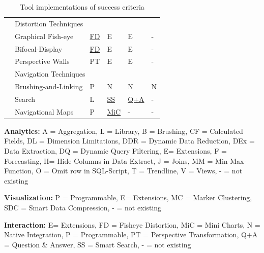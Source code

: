 \begin{table}[H]
\begin{tabular}{|l| l l l l l|}
        & \multicolumn{5}{l|}{\cellcolor{gray!30}Distortion Techniques}\\\cline{2-6}
        & Graphical Fish-eye    & \hyperlink{https://bost.ocks.org/mike/fisheye/}{ \gls{FD}  }      & \gls{E} & \gls{E} & - \\
        & Bifocal-Display       & \hyperlink{https://bost.ocks.org/mike/fisheye/}{ \gls{FD}  }      & \gls{E} & \gls{E} & - \\
        & Perspective Walls     &  \gls{PT} & \gls{E}& \gls{E}& - \\ \cline{2-6}
        
        & \multicolumn{5}{l|}{\cellcolor{gray!30}Navigation Techniques}\\\cline{2-6}
        & Brushing-and-Linking   & \gls{P} &  \gls{N} &  \gls{N} &  \gls{N} \\
        & Search                &  \gls{L} & \hyperlink{https://help.qlik.com/en-US/sense/2.2/Subsystems/Hub/Content/Search/search-tool.htm}{ \gls{SS}  }& \hyperlink{https://powerbi.microsoft.com/en-us/documentation/powerbi-service-q-and-a/}{ \gls{Q+A} }& - \\
        & Navigational Maps     & \gls{P} & \hyperlink{https://help.qlik.com/en-US/sense/1.1/Subsystems/Hub/Content/Visualizations/BarChart/BarChart.htm}{ \gls{MiC}  }  & -           & -\\
        \hline
    \end{tabular}
    \caption[Tool Implementations of Success Criteria]{Tool implementations of success criteria}
    \label{table:features}
    \end{table}
    
    \textbf{Analytics: }
    \gls{A} = Aggregation, \gls{L} = Library, \gls{B} = Brushing, \gls{CF} = Calculated Fields, \gls{DL} = Dimension Limitations, \gls{DDR} = Dynamic Data Reduction, \gls{DEx} = Data Extraction, \gls{DQ} = Dynamic Query Filtering, \gls{E}= Extensions, \gls{F} = Forecasting, \gls{H}= Hide Columns in Data Extract, \gls{J} = Joins, \gls{MM} = Min-Max-Function,  \gls{O}  = Omit row in SQL-Script, \gls{T} = Trendline, \gls{V} = Views, - = not existing
    \par 
    \textbf{Visualization: }
    \gls{P} = Programmable, \gls{E}= Extensions, \gls{MC}  = Marker Clustering, \gls{SDC} = Smart Data Compression, - = not existing
    \par
    \textbf{Interaction: }
    \gls{E}= Extensions,  \gls{FD}  = Fisheye Distortion,  \gls{MiC}   = Mini Charts,  \gls{N} = Native Integration, \gls{P} = Programmable,  \gls{PT} = Perspective Transformation, \gls{Q+A} = Question \& Answer,   \gls{SS}   = Smart Search, - = not existing
    

